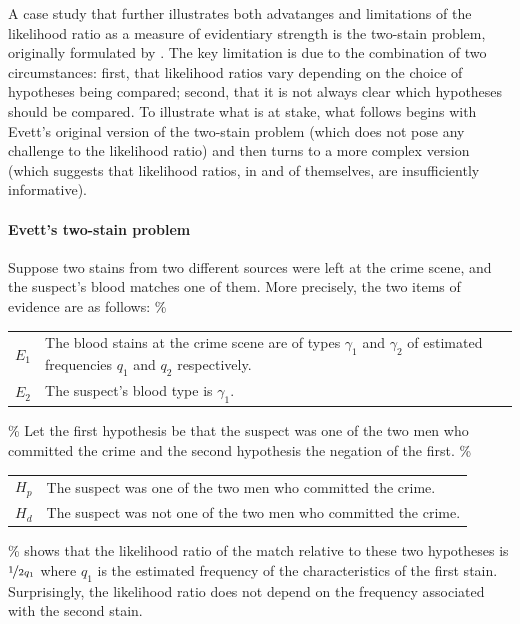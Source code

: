 \documentclass[10pt,dvipsnames,enabledeprecatedfontcommands]{scrartcl}
\let\oldparagraph\paragraph
\renewcommand{\paragraph}[1]{\oldparagraph{#1}\mbox{}}
\begin{document}
A case study that further illustrates both advatanges and limitations of
the likelihood ratio as a measure of evidentiary strength is the
two-stain problem, originally formulated by \cite{Evett1987}. The key
limitation is due to the combination of two circumstances: first, that
likelihood ratios vary depending on the choice of hypotheses being
compared; second, that it is not always clear which hypotheses should be
compared. To illustrate what is at stake, what follows begins with
Evett's original version of the two-stain problem (which does not pose
any challenge to the likelihood ratio) and then turns to a more complex
version (which suggests that likelihood ratios, in and of themselves,
are insufficiently informative).

\paragraph{Evett's two-stain problem}

Suppose two stains from two different sources were left at the crime
scene, and the suspect's blood matches one of them. More precisely, the
two items of evidence are as follows: \%

\begin{center}
    \begin{tabular}{lp{12cm}} 
        $E_1$ & The blood stains at the crime scene are of types $\gamma_1$ and $\gamma_2$ of estimated  frequencies $q_1$ and $q_2$ respectively.\\
        $E_2$ & The suspect's blood type is $\gamma_1$. 
    \end{tabular}
 \end{center}

\% Let the first hypothesis be that the suspect was one of the two men
who committed the crime and the second hypothesis the negation of the
first. \%

\begin{center}
    \begin{tabular}{lp{12cm}} 
        $H_p$ & The suspect was one of the two men who committed the crime.\\
        $H_d$ & The suspect was not one of the two men who committed the crime.
    \end{tabular}
 \end{center}

\% \cite{Evett1987} shows that the likelihood ratio of the match
relative to these two hypotheses is \(\nicefrac{1}{2q_1}\) where \(q_1\)
is the estimated frequency of the characteristics of the first stain.
Surprisingly, the likelihood ratio does not depend on the frequency
associated with the second stain.
\end{document}
